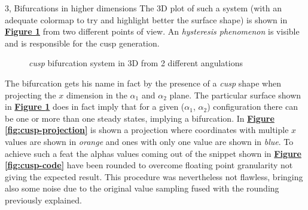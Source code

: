 \documentclass[10pt,a4paper]{article}
\begin{document}
\begin{task}{3, Bifurcations in higher dimensions}
The 3D plot of such a system (with an adequate colormap to try and highlight better the surface shape) is shown in \textbf{\hyperref[fig:cusp-3d]{Figure \ref{fig:cusp-3d}}} from two different points of view. An \textit{hysteresis phenomenon} is visible and is responsible for the cusp generation. 

\begin{figure}[H]
    \centering
    \hfill
    \caption{\textit{cusp} bifurcation system in 3D from 2 different angulations}
    \label{fig:cusp-3d}
\end{figure}
\end{task}

The bifurcation gets his name in fact by the presence of a \textit{cusp} shape when projecting the $x$ dimension in the $\alpha_1$ and $\alpha_2$ plane. The particular surface shown in \textbf{\hyperref[fig:cusp-3d]{Figure \ref{fig:cusp-3d}}} does in fact imply that for a given ($\alpha_1$, $\alpha_2$) configuration there can be one or more than one steady states, implying a bifurcation. In \textbf{\hyperref[fig:cusp-projection]{Figure \ref{fig:cusp-projection}}} is shown a projection where coordinates with multiple $x$ values are shown in \textit{orange} and ones with only one value are shown in \textit{blue}. To achieve such a feat the alphas values coming out of the snippet shown in \textbf{\hyperref[fig:cusp-code]{Figure \ref{fig:cusp-code}}} have been rounded to overcome floating point granularity not giving the expected result. This procedure was nevertheless not flawless, bringing also some noise due to the original value sampling fused with the rounding previously explained.
\end{document}
